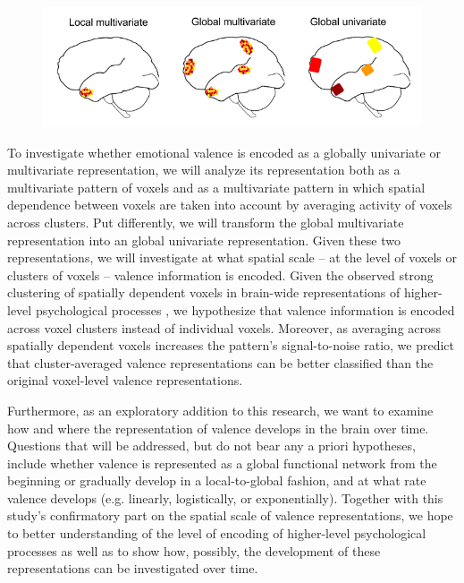 \documentclass[12pt,a4paper]{article}\usepackage[]{graphicx}\usepackage[]{color}
\begin{document}
\begin{figure}[h]
\centering
\includegraphics[scale=.55]{spatialDist}
\end{figure}

To investigate whether emotional valence is encoded as a globally univariate or multivariate representation, we will analyze its representation both as a multivariate pattern of voxels and as a multivariate pattern in which spatial dependence between voxels are taken into account by averaging activity of voxels across clusters. Put differently, we will transform the global multivariate representation into an global univariate representation. Given these two representations, we will investigate at what spatial scale -- at the level of voxels or clusters of voxels -- valence information is encoded.  Given the observed strong clustering of spatially dependent voxels in brain-wide representations of higher-level psychological processes \cite{kassam2013,oosterwijk2015,baucom2012}, we hypothesize that valence information is encoded across voxel clusters instead of individual voxels. Moreover, as averaging across spatially dependent voxels increases the pattern's signal-to-noise ratio, we predict that cluster-averaged valence representations can be better classified than the original voxel-level valence representations.  

Furthermore, as an exploratory addition to this research, we want to examine how and where the representation of valence develops in the brain over time. Questions that will be addressed, but do not bear any a priori hypotheses, include whether valence is represented as a global functional network from the beginning or gradually develop in a local-to-global fashion, and at what rate valence develops (e.g. linearly, logistically, or exponentially). Together with this study's confirmatory part on the spatial scale of valence representations, we hope to better understanding of the level of encoding of higher-level psychological processes as well as to show how, possibly, the development of these representations can be investigated over time.
\end{document}
